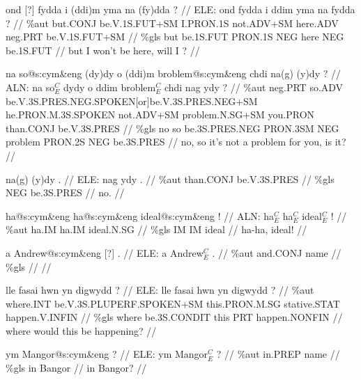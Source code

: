 \documentclass[a4paper,10pt]{article}
\begin{document}
\ex
\begingl[lingstyle=gergl]
\glchat ond [?] fydda i (ddi)m yma na (fy)dda ? //
\glsurface ELE:  ond fydda i ddim yma na fydda ?  //
\glauto \%aut  but{\scriptsize .CONJ} be{\scriptsize .V.1S.FUT+SM} I{\scriptsize .PRON.1S} not{\scriptsize .ADV+SM} here{\scriptsize .ADV} neg{\scriptsize .PRT} be{\scriptsize .V.1S.FUT+SM}   //
\glmanual \%gls  but be{\scriptsize .1S.FUT} PRON{\scriptsize .1S} NEG here NEG be{\scriptsize .1S.FUT}   //
\gleng but I won't be here, will I ? //
\endgl
\xe

\ex
\begingl[lingstyle=gergl]
\glchat na so@s:cym\&eng (dy)dy o (ddi)m broblem@s:cym\&eng chdi na(g) (y)dy ? //
\glsurface ALN:  na so$^{C}_{E}$ dydy o ddim broblem$^{C}_{E}$ chdi nag ydy ?  //
\glauto \%aut  neg{\scriptsize .PRT} so{\scriptsize .ADV} be{\scriptsize .V.3S.PRES.NEG.SPOKEN[or]be.V.3S.PRES.NEG+SM} he{\scriptsize .PRON.M.3S.SPOKEN} not{\scriptsize .ADV+SM} problem{\scriptsize .N.SG+SM} you{\scriptsize .PRON} than{\scriptsize .CONJ} be{\scriptsize .V.3S.PRES}   //
\glmanual \%gls  no so be{\scriptsize .3S.PRES.NEG} PRON{\scriptsize .3SM} NEG problem PRON{\scriptsize .2S} NEG be{\scriptsize .3S.PRES}   //
\gleng no, so it's not a problem for you, is it? //
\endgl
\xe

\ex
\begingl[lingstyle=gergl]
\glchat na(g) (y)dy . //
\glsurface ELE:  nag ydy .  //
\glauto \%aut  than{\scriptsize .CONJ} be{\scriptsize .V.3S.PRES}   //
\glmanual \%gls  NEG be{\scriptsize .3S.PRES}   //
\gleng no. //
\endgl
\xe

\ex
\begingl[lingstyle=gergl]
\glchat ha@s:cym\&eng ha@s:cym\&eng ideal@s:cym\&eng ! //
\glsurface ALN:  ha$^{C}_{E}$ ha$^{C}_{E}$ ideal$^{C}_{E}$ !  //
\glauto \%aut  ha{\scriptsize .IM} ha{\scriptsize .IM} ideal{\scriptsize .N.SG}   //
\glmanual \%gls  IM IM ideal   //
\gleng ha-ha, ideal! //
\endgl
\xe

\ex
\begingl[lingstyle=gergl]
\glchat a Andrew@s:cym\&eng [?] . //
\glsurface ELE:  a Andrew$^{C}_{E}$ .  //
\glauto \%aut  and{\scriptsize .CONJ} name   //
\glmanual \%gls      //
\gleng  //
\endgl
\xe

\ex
\begingl[lingstyle=gergl]
\glchat lle fasai hwn yn digwydd ? //
\glsurface ELE:  lle fasai hwn yn digwydd ?  //
\glauto \%aut  where{\scriptsize .INT} be{\scriptsize .V.3S.PLUPERF.SPOKEN+SM} this{\scriptsize .PRON.M.SG} stative{\scriptsize .STAT} happen{\scriptsize .V.INFIN}   //
\glmanual \%gls  where be{\scriptsize .3S.CONDIT} this PRT happen{\scriptsize .NONFIN}   //
\gleng where would this be happening? //
\endgl
\xe

\ex
\begingl[lingstyle=gergl]
\glchat ym Mangor@s:cym\&eng ? //
\glsurface ELE:  ym Mangor$^{C}_{E}$ ?  //
\glauto \%aut  in{\scriptsize .PREP} name   //
\glmanual \%gls  in Bangor   //
\gleng in Bangor? //
\endgl
\xe
\end{document}
